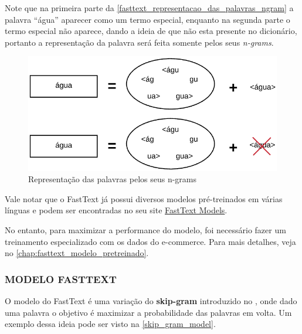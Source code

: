 Note que na primeira parte da \autoref{fasttext_representacao_das_palavras_ngram} a palavra “água” aparecer como um termo especial, enquanto na segunda parte o termo especial não aparece, dando a ideia de que não esta presente no dicionário, portanto a representação da palavra será feita somente pelos seus \textit{n-grams}.

\begin{figure}[]
	\caption{\label{fasttext_representacao_das_palavras_ngram} Representação das palavras pelos seus n-grams}
	\begin{center}
	    \includegraphics[scale=0.5]{artigo/recursos/imagens/fasttext_representacao_das_palavras_ngram.png}
	\end{center}
\end{figure}

Vale notar que o FastText já possui diversos modelos pré-treinados em várias línguas e podem ser encontradas no seu site \href{https://fasttext.cc/docs/en/english-vectors.html}{FastText Models}.

No entanto, para maximizar a performance do modelo, foi necessário fazer um treinamento especializado com os dados do e-commerce. Para mais detalhes, veja no \autoref{chap:fasttext_modelo_pretreinado}.

\subsubsection{MODELO FASTTEXT}

O modelo do FastText é uma variação do \textbf{skip-gram} introduzido no \cite{mikolov}, onde dado uma palavra o objetivo é maximizar a probabilidade das palavras em volta. Um exemplo dessa ideia pode ser visto na \autoref{skip_gram_model}.

